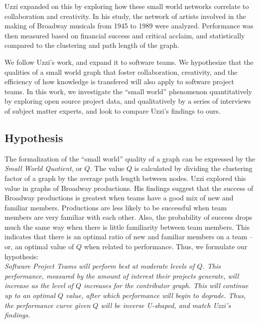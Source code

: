\documentclass{proc}
\begin{document}
Uzzi \cite{uzzi2005collaboration} expanded on this by exploring how these small world networks correlate to collaboration and creativity. In his study, the network of artists involved in the making of Broadway musicals from 1945 to 1989 were analyzed. Performance was then measured based on financial success and critical acclaim, and statistically compared to the clustering and path length of the graph.

We follow Uzzi's work, and expand it to software teams. We hypothesize that the qualities of a small world graph that foster collaboration, creativity, and the efficiency of how knowledge is transfered\cite{latora2001efficient} will also apply to software project teams. In this work, we investigate the ``small world'' phenomenon quantitatively by exploring open source project data, and qualitatively by a series of interviews of subject matter experts, and look to compare Uzzi's findings to ours.

\subsection{Hypothesis}
The formalization of the ``small world'' quality of a graph can be expressed by the \textit{Small World Quotient}, or $Q$\cite{watts1999small,watts1998collective}. The value $Q$ is calculated by dividing the clustering factor of a graph by the average path length between nodes. Uzzi explored this value in graphs of Broadway productions\cite{uzzi2005collaboration}. His findings suggest that the success of Broadway productions is greatest when teams have a good mix of new and familiar members. Productions are less likely to be successful when team members are very familiar with each other. Also, the probability of success drops much the same way when there is little familiarity between team members. This indicates that there is an optimal ratio of new and familiar members on a team -- or, an optimal value of $Q$ when related to performance. Thus, we formulate our hypothesis:\\

\textit{Software Project Teams will perform best at moderate levels of $Q$. This performance, measured by the amount of interest their projects generate, will increase as the level of $Q$ increases for the contributor graph. This will continue up to an optimal $Q$ value, after which performance will begin to degrade. Thus, the performance curve given $Q$ will be inverse U-shaped, and match Uzzi's findings\cite{uzzi2005collaboration}.}
\end{document}
